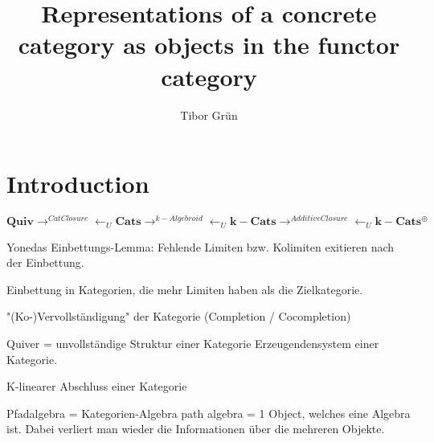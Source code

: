 \documentclass{article}
\title{Representations of a concrete category as objects in the functor category}
\author{Tibor Gr{\"u}n}
\theoremstyle{definition}
\begin{document}

	\maketitle

	\newpage

	\tableofcontents

	\newpage


%

\section{Introduction}

\[
\mathbf{Quiv}\rightarrow^{CatClosure}\leftarrow_{U}\mathbf{Cats}
\rightarrow^{k-Algebroid}\leftarrow_{U}\mathbf{k-Cats}
\rightarrow^{AdditiveClosure}\leftarrow_{U}\mathbf{k-Cats^{\oplus}}
\]










%

%





%



Yonedas Einbettungs-Lemma: Fehlende Limiten bzw. Kolimiten exitieren nach der Einbettung.

Einbettung in Kategorien, die mehr Limiten haben als die Zielkategorie.

"(Ko-)Vervollständigung" der Kategorie (Completion / Cocompletion)

Quiver = unvollständige Struktur einer Kategorie
Erzeugendensystem einer Kategorie.

K-linearer Abschluss einer Kategorie

Pfadalgebra = Kategorien-Algebra
path algebra = 1 Object, welches eine Algebra ist. Dabei verliert man wieder die Informationen über die
mehreren Objekte.
\end{document}
